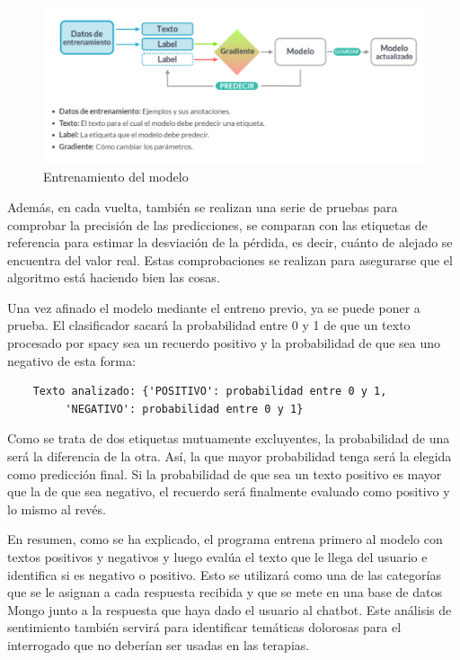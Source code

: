 \begin{figure}[h]
	\centering
	\includegraphics[scale=0.5]{Imagenes/Vectorial/entrenamiento_modelo}
	\caption{Entrenamiento del modelo}
	\label{fig:entrenamiento}
\end{figure}

Además, en cada vuelta, también se realizan una serie de pruebas para comprobar la precisión de las predicciones, se comparan con las etiquetas de referencia para estimar la desviación de la pérdida, es decir, cuánto de alejado se encuentra del valor real. Estas comprobaciones se realizan para asegurarse que el algoritmo está haciendo bien las cosas.

Una vez afinado el modelo mediante el entreno previo, ya se puede poner a prueba. El clasificador sacará la probabilidad entre 0 y 1 de que un texto procesado por spacy sea un recuerdo positivo y la probabilidad de que sea uno negativo de esta forma:

\begin{verbatim}
	Texto analizado: {'POSITIVO': probabilidad entre 0 y 1,
		 'NEGATIVO': probabilidad entre 0 y 1}
\end{verbatim}

Como se trata de dos etiquetas mutuamente excluyentes, la probabilidad de una será la diferencia de la otra. Así, la que mayor probabilidad tenga será la elegida como predicción final. Si la probabilidad de que sea un texto positivo es mayor que la de que sea negativo, el recuerdo será finalmente evaluado como positivo y lo mismo al revés.

En resumen, como se ha explicado, el programa entrena primero al modelo con textos positivos y negativos y luego evalúa el texto que le llega del usuario e identifica si es negativo o positivo. Esto se utilizará como una de las categorías que se le asignan a cada respuesta recibida y que se mete en una base de datos Mongo junto a la respuesta que haya dado el usuario al chatbot. Este análisis de sentimiento también servirá para identificar temáticas dolorosas para el interrogado que no deberían ser usadas en las terapias.

